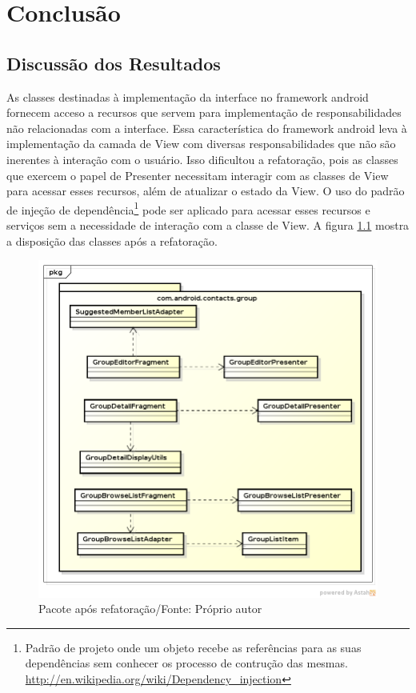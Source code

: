 \chapter{Conclusão} 

\section{Discussão dos Resultados} 

As classes destinadas à implementação da interface no framework android fornecem
acceso a recursos que servem para implementação de responsabilidades não
relacionadas com a interface. Essa característica do framework android leva à
implementação da camada de View com diversas responsabilidades que não são
inerentes à interação com o usuário. Isso dificultou a refatoração, pois as
classes que exercem o papel de Presenter necessitam interagir com as classes de
View para acessar esses recursos, além de atualizar o estado da View. O uso do
padrão de injeção de
dependência\footnote{Padrão
de projeto onde um objeto recebe as referências para as suas dependências sem
conhecer os processo de contrução das mesmas.
\url{http://en.wikipedia.org/wiki/Dependency_injection}}
pode ser aplicado para acessar esses recursos e serviços sem a necessidade de
interação com a classe de View. A figura \ref{fig:classes_iteracao3} mostra a
disposição das classes após a refatoração.


\begin{figure}[!h]
	\centering
	\label{fig:classes_iteracao3}
	\includegraphics[scale=0.55]{img/classes_iteracao3}
	\caption{Pacote após refatoração/Fonte: Próprio autor}
\end{figure}


